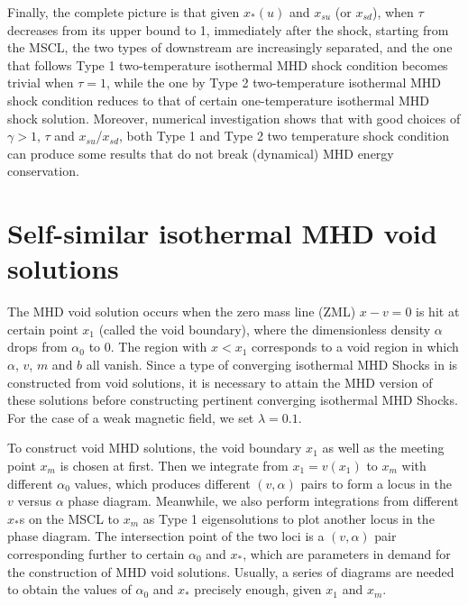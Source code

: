 \documentclass[fleqn,usenatbib]{mnras}
\begin{document}
Finally, the complete picture is that given $x_{*}(u)$ and $x_{su}$ (or $x_{sd}$), when $\tau$ decreases from its upper bound to 1, immediately after the shock, starting from the MSCL, the two types of downstream are increasingly separated, and the one that follows Type 1 two-temperature isothermal MHD shock condition becomes trivial when $\tau=1$, while the one by Type 2 two-temperature isothermal MHD shock condition reduces to that of certain one-temperature isothermal MHD shock solution. Moreover, numerical investigation shows that with good choices of $\gamma>1$, $\tau$ and $x_{su}$/$x_{sd}$, both Type 1 and Type 2 two temperature shock condition can produce some results that do not break (dynamical) MHD energy conservation.


\section{Self-similar isothermal MHD void solutions}
\label{s4}
The MHD void solution occurs when the zero mass line (ZML) $x-v=0$ is hit at certain point $x_{1}$ (called the void boundary), where the dimensionless density $\alpha$ drops from $\alpha_{0}$ to 0. The region with $x<x_{1}$ corresponds to a void region in which $\alpha$, $v$, $m$ and $b$ all vanish. Since a type of converging isothermal MHD Shocks in \citet{lou2014self} is constructed from void solutions, it is necessary to attain the MHD version of these solutions before constructing pertinent converging isothermal MHD Shocks. For the case of a weak magnetic field, we set $\lambda=0.1$.

To construct void MHD solutions, the void boundary $x_{1}$ as well as the meeting point $x_{m}$ is chosen at first. Then we integrate from $x_{1}=v(x_{1})$ to $x_{m}$ with different $\alpha_{0}$ values, which produces different $(v,\alpha)$ pairs to form a locus in the $v$ versus $\alpha$ phase diagram. Meanwhile, we also perform integrations from different $x_{*}$s on the MSCL to $x_{m}$ as Type 1 eigensolutions to plot another locus in the phase diagram. The intersection point of the two loci is a $(v,\alpha)$ pair corresponding further to certain $\alpha_{0}$ and $x_{*}$, which are parameters in demand for the construction of MHD void solutions. Usually, a series of diagrams are needed to obtain the values of $\alpha_{0}$ and $x_{*}$ precisely enough, given $x_{1}$ and $x_{m}$. 
\end{document}
